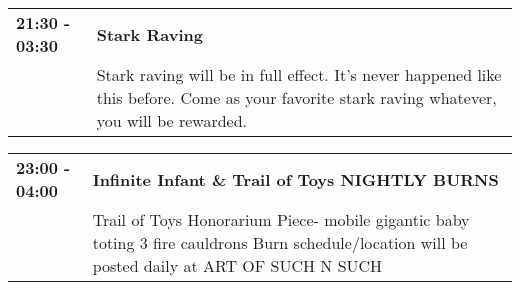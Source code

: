 \begin{tabular}{ p{1in} p{2.2in} }
    \textbf{21:30 - 03:30} & \textbf{Stark Raving} \\
    ~ \newline  & Stark raving will be in full effect.  It's never happened like this before.  Come as your favorite stark raving whatever, you will be rewarded. \\
    \hline 
\end{tabular}
    
\begin{tabular}{ p{1in} p{2.2in} }
    \textbf{23:00 - 04:00} & \textbf{Infinite Infant \& Trail of Toys NIGHTLY BURNS} \\
    ~ \newline  & Trail of Toys Honorarium Piece- mobile gigantic baby toting 3 fire cauldrons Burn schedule/location will be posted daily at ART OF SUCH N SUCH \\
    \hline 
\end{tabular}
    
